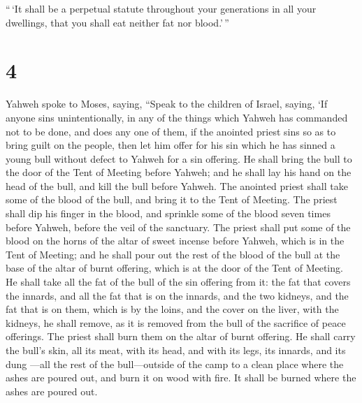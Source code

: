  ``\,`It shall be a perpetual statute throughout your
generations in all your dwellings, that you shall eat neither fat nor
blood.'\,''

\hypertarget{section-3}{%
\section{4}\label{section-3}}

 Yahweh spoke to Moses, saying,  ``Speak to the
children of Israel, saying, `If anyone sins unintentionally, in any of
the things which Yahweh has commanded not to be done, and does any one
of them,  if the anointed priest sins so as to bring guilt
on the people, then let him offer for his sin which he has sinned a
young bull without defect to Yahweh for a sin offering.  He
shall bring the bull to the door of the Tent of Meeting before Yahweh;
and he shall lay his hand on the head of the bull, and kill the bull
before Yahweh.  The anointed priest shall take some of the
blood of the bull, and bring it to the Tent of Meeting.  The
priest shall dip his finger in the blood, and sprinkle some of the blood
seven times before Yahweh, before the veil of the sanctuary.
 The priest shall put some of the blood on the horns of the
altar of sweet incense before Yahweh, which is in the Tent of Meeting;
and he shall pour out the rest of the blood of the bull at the base of
the altar of burnt offering, which is at the door of the Tent of
Meeting.  He shall take all the fat of the bull of the sin
offering from it: the fat that covers the innards, and all the fat that
is on the innards,  and the two kidneys, and the fat that is
on them, which is by the loins, and the cover on the liver, with the
kidneys, he shall remove,  as it is removed from the bull
of the sacrifice of peace offerings. The priest shall burn them on the
altar of burnt offering.  He shall carry the bull's skin,
all its meat, with its head, and with its legs, its innards, and its
dung  ---all the rest of the bull---outside of the camp to
a clean place where the ashes are poured out, and burn it on wood with
fire. It shall be burned where the ashes are poured out.

